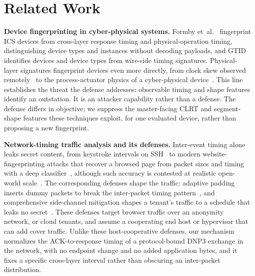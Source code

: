 \section{Related Work}
\label{sec:related}

\noindent\textbf{Device fingerprinting in cyber-physical systems.} Formby et~al.~\cite{formby2016}
fingerprint ICS devices from cross-layer response timing and physical-operation timing, distinguishing
device types and instances without decoding payloads, and GTID~\cite{gtid2015} identifies devices and
device types from wire-side timing signatures. Physical-layer signatures fingerprint devices even more
directly, from clock skew observed remotely~\cite{kohno2005} to the process-actuator physics of a
cyber-physical device~\cite{gu2018}. This line establishes the threat the defense addresses:
observable timing and shape features identify an outstation. It is an attacker capability rather than a
defense. The defense differs in objective; we suppress the master-facing CLRT and segment-shape features
these techniques exploit, for one evaluated device, rather than proposing a new fingerprint.

\noindent\textbf{Network-timing traffic analysis and its defenses.} Inter-event timing alone leaks
secret content, from keystroke intervals on SSH~\cite{song2001} to modern website-fingerprinting
attacks that recover a browsed page from packet sizes and timing with a deep
classifier~\cite{sirinam2018}, although such accuracy is contested at realistic open-world
scale~\cite{panchenko2016}. The corresponding defenses shape the traffic: adaptive padding inserts
dummy packets to break the inter-packet timing pattern~\cite{juarez2016}, and comprehensive
side-channel mitigation shapes a tenant's traffic to a schedule that leaks no secret~\cite{pacer2022}.
These defenses target browser traffic over an anonymity network, or cloud tenants, and assume a
cooperating end host or hypervisor that can add cover traffic. Unlike these host-cooperative defenses, our mechanism normalizes the ACK-to-response timing of a
protocol-bound DNP3 exchange in the network, with no endpoint change and no added application bytes,
and it fixes a specific cross-layer interval rather than obscuring an inter-packet distribution.

